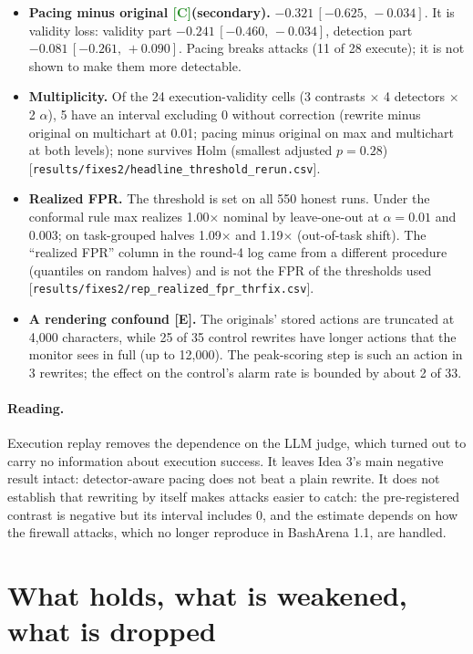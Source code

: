 \documentclass[11pt]{article}
\newcommand{\tC}{\textsf{\scriptsize\textcolor{ForestGreen}{[C]}}\xspace}
\newcommand{\tE}{\textsf{\scriptsize\textcolor{ink2}{[E]}}\xspace}
\newcommand{\src}[1]{{\footnotesize\textcolor{ink2}{[\nolinkurl{#1}]}}}
\newcommand{\ci}[2]{\,[#1,\,#2]}
\begin{document}
\begin{itemize}
\item \textbf{Pacing minus original \tC (secondary).} $-0.321\ci{-0.625}{-0.034}$. It is validity loss: validity part $-0.241\ci{-0.460}{-0.034}$, detection part $-0.081\ci{-0.261}{+0.090}$. Pacing breaks attacks (11 of 28 execute); it is not shown to make them more detectable.
\item \textbf{Multiplicity.} Of the 24 execution-validity cells (3 contrasts $\times$ 4 detectors $\times$ 2 $\alpha$), 5 have an interval excluding 0 without correction (rewrite minus original on multichart at 0.01; pacing minus original on max and multichart at both levels); none survives Holm (smallest adjusted $p=0.28$) \src{results/fixes2/headline_threshold_rerun.csv}.
\item \textbf{Realized FPR.} The threshold is set on all 550 honest runs. Under the conformal rule max realizes 1.00$\times$ nominal by leave-one-out at $\alpha=0.01$ and 0.003; on task-grouped halves 1.09$\times$ and 1.19$\times$ (out-of-task shift). The ``realized FPR'' column in the round-4 log came from a different procedure (quantiles on random halves) and is not the FPR of the thresholds used \src{results/fixes2/rep_realized_fpr_thrfix.csv}.
\item \textbf{A rendering confound \tE.} The originals' stored actions are truncated at 4{,}000 characters, while 25 of 35 control rewrites have longer actions that the monitor sees in full (up to 12{,}000). The peak-scoring step is such an action in 3 rewrites; the effect on the control's alarm rate is bounded by about 2 of 33.
\end{itemize}

\paragraph{Reading.} Execution replay removes the dependence on the LLM judge, which turned out to carry no information about execution success. It leaves Idea 3's main negative result intact: detector-aware pacing does not beat a plain rewrite. It does not establish that rewriting by itself makes attacks easier to catch: the pre-registered contrast is negative but its interval includes 0, and the estimate depends on how the firewall attacks, which no longer reproduce in BashArena 1.1, are handled.

\section{What holds, what is weakened, what is dropped}\label{sec:status}
\end{document}
